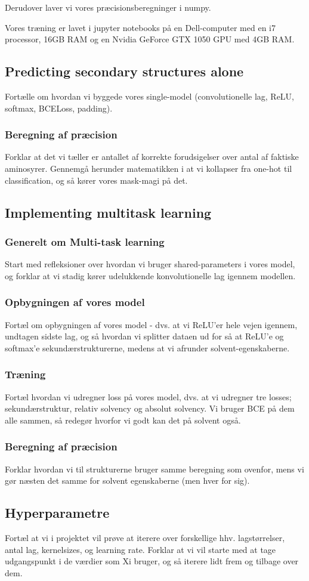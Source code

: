 Derudover laver vi vores præcisionsberegninger i numpy.

Vores træning er lavet i jupyter notebooks på en Dell-computer med en i7 processor, 16GB RAM og en Nvidia GeForce GTX 1050 GPU med 4GB RAM.

\subsection{Predicting secondary structures alone}
Fortælle om hvordan vi byggede vores single-model (convolutionelle lag, ReLU, softmax, BCELoss, padding).

\subsubsection{Beregning af præcision}
Forklar at det vi tæller er antallet af korrekte forudsigelser over antal af faktiske aminosyrer. Gennemgå herunder matematikken i at vi kollapser fra one-hot til classification, og så kører vores mask-magi på det.

\subsection{Implementing multitask learning}
\subsubsection{Generelt om Multi-task learning}
Start med refleksioner over hvordan vi bruger shared-parameters i vores model, og forklar at vi stadig kører udelukkende konvolutionelle lag igennem modellen.
\subsubsection{Opbygningen af vores model}
Fortæl om opbygningen af vores model - dvs. at vi ReLU'er hele vejen igennem, undtagen sidste lag, og så hvordan vi splitter dataen ud for så at ReLU'e og softmax'e sekundærstrukturerne, medens at vi afrunder solvent-egenskaberne.

\subsubsection{Træning}
Fortæl hvordan vi udregner loss på vores model, dvs. at vi udregner tre losses; sekundærstruktur, relativ solvency og absolut solvency. Vi bruger BCE på dem alle sammen, så redegør hvorfor vi godt kan det på solvent også.

\subsubsection{Beregning af præcision}
Forklar hvordan vi til strukturerne bruger samme beregning som ovenfor, mens vi gør næsten det samme for solvent egenskaberne (men hver for sig).

\subsection{Hyperparametre}
Fortæl at vi i projektet vil prøve at iterere over forskellige hhv. lagstørrelser, antal lag, kernelsizes, og learning rate.
Forklar at vi vil starte med at tage udgangspunkt i de værdier som Xi bruger, og så iterere lidt frem og tilbage over dem.





